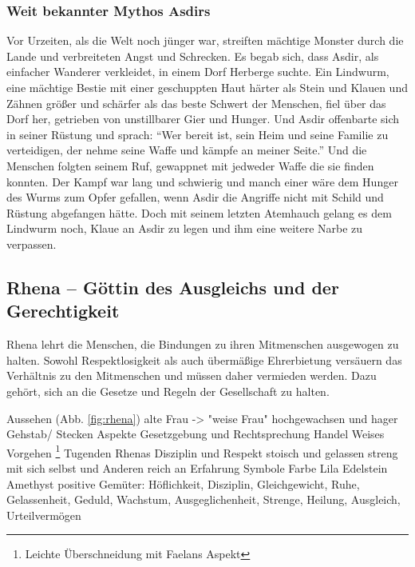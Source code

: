 \subsubsection{Weit bekannter Mythos Asdirs}
Vor Urzeiten, als die Welt noch jünger war, streiften mächtige Monster durch die Lande und verbreiteten Angst und Schrecken. 
Es begab sich, dass Asdir, als einfacher Wanderer verkleidet, in einem Dorf Herberge suchte. 
Ein Lindwurm, eine mächtige Bestie mit einer geschuppten Haut härter als Stein und Klauen und Zähnen größer und schärfer als das beste Schwert der Menschen, fiel über das Dorf her, getrieben von unstillbarer Gier und Hunger. 
Und Asdir offenbarte sich in seiner Rüstung und sprach: 
``Wer bereit ist, sein Heim und seine Familie zu verteidigen, der nehme seine Waffe und kämpfe an meiner Seite.'' 
Und die Menschen folgten seinem Ruf, gewappnet mit jedweder Waffe die sie finden konnten. 
Der Kampf war lang und schwierig und manch einer wäre dem Hunger des Wurms zum Opfer gefallen, wenn Asdir die Angriffe nicht mit Schild und Rüstung abgefangen hätte. 
Doch mit seinem letzten Atemhauch gelang es dem Lindwurm noch, Klaue an Asdir zu legen und ihm eine weitere Narbe zu verpassen.





\subsection{Rhena -- Göttin des Ausgleichs und der Gerechtigkeit}
Rhena lehrt die Menschen, die Bindungen zu ihren Mitmenschen ausgewogen zu halten. 
Sowohl Respektlosigkeit als auch übermäßige Ehrerbietung versäuern das Verhältnis zu den Mitmenschen und müssen daher vermieden werden. 
Dazu gehört, sich an die Gesetze und Regeln der Gesellschaft zu halten.
\begin{outline}
	\1 Aussehen (Abb. \ref{fig:rhena})
		\2 alte Frau  -> "weise Frau"
		\2 hochgewachsen und hager
		\2 Gehstab/ Stecken
	\1 Aspekte
		\2 Gesetzgebung und Rechtsprechung
		\2 Handel
		\2 Weises Vorgehen \footnote{Leichte Überschneidung mit Faelans Aspekt}
	\1 Tugenden Rhenas
		\2 Disziplin und Respekt
		\2 stoisch und gelassen
		\2 streng mit sich selbst und Anderen
		\2 reich an Erfahrung
	\1 Symbole
		\2 Farbe Lila
		\2 Edelstein Amethyst
	\1 positive Gemüter: Höflichkeit, Disziplin, Gleichgewicht, Ruhe, Gelassenheit, Geduld, Wachstum, Ausgeglichenheit, Strenge, Heilung, Ausgleich, Urteilvermögen
\end{outline}

